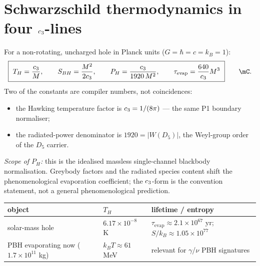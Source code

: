 \section{Schwarzschild thermodynamics in four $c_3$-lines}
For a non-rotating, uncharged hole in Planck units ($G{=}\hbar{=}c{=}k_B{=}1$):
\[
  \boxed{\ T_H=\frac{\cthree}{M},\qquad S_{BH}=\frac{M^2}{2\cthree},\qquad
  P_H=\frac{\cthree}{1920\,M^2},\qquad \tau_{\mathrm{evap}}=\frac{640}{\cthree}M^3\ }\qquad\mC.
\]
Two of the constants are compiler numbers, not coincidences:
\begin{itemize}\setlength\itemsep{2pt}
\item the Hawking temperature factor is $c_3=1/(8\pi)$ --- the same P1 boundary normaliser; \mE
\item the radiated-power denominator is $1920=|W(D_5)|$, the Weyl-group order of the $D_5$ carrier. \mE
\end{itemize}
\noindent\emph{Scope of $P_H$:} this is the idealised massless single-channel blackbody normalisation.
Greybody factors and the radiated species content shift the phenomenological evaporation coefficient; the
$c_3$-form is the convention statement, not a general phenomenological prediction.

\begin{center}\small
\renewcommand{\arraystretch}{1.2}
\begin{tabularx}{\linewidth}{@{}p{4.2cm}YY@{}}
\toprule
\textbf{object} & \textbf{$T_H$} & \textbf{lifetime / entropy} \\
\midrule
solar-mass hole & $6.17\times10^{-8}$ K & $\tau_{\mathrm{evap}}\approx2.1\times10^{67}$ yr; $S/k_B\approx1.05\times10^{77}$ \\
PBH evaporating now ($1.7\times10^{11}$ kg) & $k_BT\approx61$ MeV & relevant for $\gamma$/$\nu$ PBH signatures \\
\bottomrule
\end{tabularx}
\end{center}

